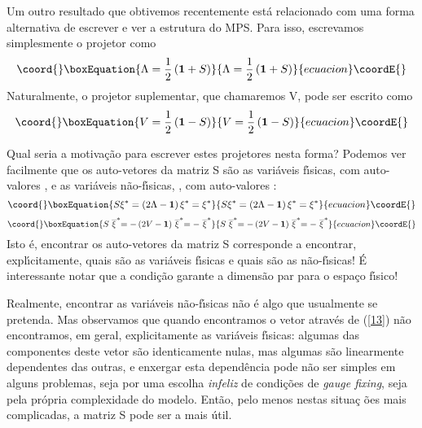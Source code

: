 \documentclass[a4paper,thmsa,12pt]{report}
\begin{document}
Um outro resultado que obtivemos recentemente est\'{a} relacionado com uma
forma alternativa de escrever e ver a estrutura do MPS. Para isso,
escrevamos simplesmente o projetor como 
\begin{equation}\coord{}\boxEquation{
\Lambda =\frac{1}{2}\left( \mathbf{1}+S\right)  \label{vi}
}{
\Lambda =\frac{1}{2}\left( \mathbf{1}+S\right)  }{ecuacion}\coordE{}\end{equation}
Naturalmente, o projetor suplementar, que chamaremos V, pode ser escrito
como 
\begin{equation}\coord{}\boxEquation{
V=\frac{1}{2}\left( \mathbf{1}-S\right)  \label{vii}
}{
V=\frac{1}{2}\left( \mathbf{1}-S\right)  }{ecuacion}\coordE{}\end{equation}

Qual seria a motiva\c{c}\~{a}o para escrever estes projetores nesta forma?
Podemos ver facilmente que os auto-vetores da matriz S s\~{a}o as
vari\'{a}veis f\'{\i}sicas, \myHighlight{$\xi ^{*},$}\coordHE{} com auto-valores \coordHE{}, e as
vari\'{a}veis n\~{a}o-f\'{\i}sicas, \myHighlight{$\stackrel{\_}{\xi }^{*}$}\coordHE{}, com
auto-valores \coordHE{}: 
\begin{equation}\coord{}\boxEquation{
S\xi ^{*}=\left( 2\Lambda -\mathbf{1}\right) \xi ^{*}=\xi ^{*}  \label{viii}
}{
S\xi ^{*}=\left( 2\Lambda -\mathbf{1}\right) \xi ^{*}=\xi ^{*}  }{ecuacion}\coordE{}\end{equation}
\begin{equation}\coord{}\boxEquation{
S\stackrel{\_}{\xi }^{*}=-\left( 2V-\mathbf{1}\right) \stackrel{\_}{\xi }
^{*}=-\stackrel{\_}{\xi }^{*}  \label{ix}
}{
S\stackrel{\_}{\xi }^{*}=-\left( 2V-\mathbf{1}\right) \stackrel{\_}{\xi }
^{*}=-\stackrel{\_}{\xi }^{*}  }{ecuacion}\coordE{}\end{equation}
Isto \'{e}, encontrar os
auto-vetores da matriz S corresponde a encontrar, expl\'{\i}citamente, quais
s\~{a}o as vari\'{a}veis f\'{\i}sicas e quais s\~{a}o as
n\~{a}o-f\'{\i}sicas! \'{E} interessante notar que a condi\c{c}\~{a}o \coordHE{} garante a
dimens\~{a}o par para o espa\c{c}o f\'{\i}sico! 

Realmente, encontrar as vari\'{a}veis n\~{a}o-f\'{\i}sicas n\~{a}o \'{e}
algo que usualmente se pretenda. Mas observamos que quando encontramos o
vetor \myHighlight{$\mathbf{\xi }^{\ast }$}\coordHE{} atrav\'{e}s de (\ref{13}) n\~{a}o encontramos,
em geral, explicitamente as vari\'{a}veis f\'{\i}sicas: algumas das
componentes deste vetor s\~{a}o identicamente nulas, mas algumas s\~{a}o
linearmente dependentes das outras, e enxergar esta depend\^{e}ncia pode
n\~{a}o ser simples em alguns problemas, seja por uma escolha \textit{%
infeliz }de condi\c{c}\~{o}es de \textit{gauge fixing}, seja pela
pr\'{o}pria complexidade do modelo. Ent\~{a}o, pelo menos nestas situa\c{c}%
\~{o}es mais complicadas, a matriz S pode ser a mais \'{u}til.
\end{document}
